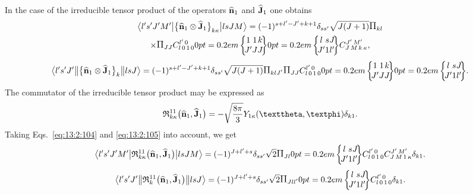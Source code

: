 In the case of the irreducible tensor product of the operators \(\widehat{\mathbf{n}}_{1}\) and \(\widehat{\mathbf{J}}_{1}\) one obtains
\begin{multline}
\braOket{ l^{\prime} s^{\prime} J^{\prime} M^{\prime}}{\bigl\{\widehat{\vect{n}}_{1} \otimes \widehat{\vect{J}}_{1}\bigr\}_{k \kappa}}{l s J M}=  (-1)^{s+l^{\prime}-J^{\prime}+k+1} \delta_{s s^{\prime}} \sqrt{J(J+1)}\Fact{k l} \\
 \times \Fact{J J}
\clebsch{l}{0}{1}{0}{l^{\prime}}{0}
\sixj{1}{1}{k}{J^{\prime}}{J}{J}
\sixj{l}{s}{J}{J^{\prime}}{1}{l^{\prime}}
\clebsch{J}{M}{k}{\kappa}{J^{\prime}}{M^{\prime}}, \label{eq:13:2:52}
\end{multline}
\begin{multline*}
\braOketred{ l^{\prime} s^{\prime} J^{\prime}}{\bigl\{\widehat{\vect{n}}_{1} \otimes \widehat{\vect{J}}_{1}\bigr\}_{k}}{l s J}=(-1)^{s+l^{\prime}-J^{\prime}+k+1} \delta_{s s^{\prime}} \sqrt{J(J+1)}\Fact{k l J^{\prime}}\Fact{J J} 
\clebsch{l}{0}{1}{0}{l^{\prime}}{0}
\sixj{1}{1}{k}{J^{\prime}}{J}{J}
\sixj{l}{s}{J}{J^{\prime}}{1}{l^{\prime}} .
\end{multline*}
The commutator of the irreducible tensor product may be expressed as
\begin{equation}
\mathfrak{R}_{k \kappa}^{11}\bigl(\widehat{\vect{n}}_{1}, \widehat{\vect{J}}_{1}\bigr)=-\sqrt{\frac{8 \pi}{3}} Y_{1 \kappa}(\vartheta, \varphi) \delta_{k 1}. \label{eq:13:2:53}
\end{equation}
Taking Eqs.~\eqref{eq:13:2:104} and \eqref{eq:13:2:105} into account, we get
\begin{equation}
\braOket{ l^{\prime} s^{\prime} J^{\prime} M^{\prime}}{ \mathfrak{R}_{k \kappa}^{11}\bigl(\widehat{\vect{n}}_{1}, \widehat{\vect{J}}_{1}\bigr)}{l s J M}=(-1)^{J+l^{\prime}+s} \delta_{s s^{\prime}} \sqrt{2}\Fact{J l}
\sixj{l}{s}{J}{J^{\prime}}{1}{l^{\prime}} 
\clebsch{l}{0}{1}{0}{l^{\prime}}{0} 
\clebsch{J}{M}{1}{\kappa}{J^{\prime}}{M^{\prime}} \delta_{k 1}. \label{eq:13:2:54}
\end{equation}
\begin{equation*}
\braOketred{ l^{\prime} s^{\prime} J^{\prime}}{ \mathfrak{R}_{k}^{11}\bigl(\widehat{\vect{n}}_{1}, \widehat{\vect{J}}_{1}\bigr)}{l s J}=(-1)^{J+l^{\prime}+s} \delta_{s s^{\prime}} \sqrt{2}\Fact{J l l^{\prime}}
\sixj{l}{s}{J}{J^{\prime}}{1}{l^{\prime}} 
\clebsch{l}{0}{1}{0}{l^{\prime}}{0} 
\delta_{k 1}.
\end{equation*}

